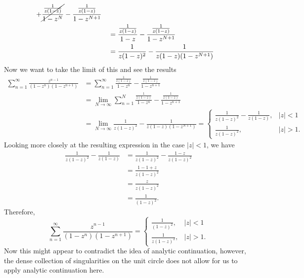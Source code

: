 \documentclass[10pt]{amsart}
\theoremstyle{nonumberplain}
\begin{document}
\begin{enumerate}[label={\bf {\arabic*}:}]
\begin{align*}
		+ \cancel{\frac {\frac 1 {z (1 - z)}}{1 - z^N}} - \frac{\frac 1 {z (1 - z)}}{1 - z^{N + 1}} \\
	& \quad = \frac {\frac 1 {z (1 - z)}}{1 - z} - \frac{\frac 1 {z (1 - z)}}{1 - z^{N + 1}} \\
	& \quad = \frac {1}{z (1 - z)^2} - \frac1{z (1 - z)(1 - z^{N + 1})}
\end{align*}
Now we want to take the limit of this and see the results
\begin{align*}
\sum_{n=1}^{\infty} \frac{z^{n-1}}{\left(1-z^n\right)\left(1-z^{n+1}\right)}
	&= \sum_{n=1}^{\infty} \frac {\frac 1 {z (1 - z)}}{1 - z^n} - \frac{\frac 1 {z (1 - z)}}{1 - z^{n + 1}} \\
	&= \lim_{N\rightarrow \infty} \sum_{n=1}^{N} \frac {\frac 1 {z (1 - z)}}{1 - z^n} - \frac{\frac 1 {z (1 - z)}}{1 - z^{n + 1}} \\
	&= \lim_{N\rightarrow \infty} \frac {1}{z (1 - z)^2} - \frac1{z (1 - z)(1 - z^{N + 1})}
		= \begin{cases} \frac {1}{z (1 - z)^2} - \frac1{z (1 - z)}, & |z|<1 \\ \frac{1}{z(1-z)^2}, & |z|>1 .\end{cases}
\end{align*}
Looking more closely at the resulting expression in the case $|z| < 1$, we have
\begin{align*}
\frac {1}{z (1 - z)^2} - \frac1{z (1 - z)} &= \frac {1}{z (1 - z)^2} - \frac{1 - z}{z (1 - z)^2} \\
	&= \frac {1 - 1 + z}{z (1 - z)^2} \\
	&= \frac {z}{z (1 - z)^2} \\
	&= \frac 1 {(1 - z)^2}.
\end{align*}
Therefore,
$$
\sum_{n=1}^{\infty} \frac{z^{n-1}}{\left(1-z^n\right)\left(1-z^{n+1}\right)}= \begin{cases}\frac{1}{(1-z)^2}, & |z|<1 \\ \frac{1}{z(1-z)^2}, & |z|>1 .\end{cases}
$$
Now this might appear to contradict the idea of analytic continuation, however, the dense collection of singularities on the unit circle does not allow for us to apply analytic continuation here. \\


\end{enumerate}
\end{document}
